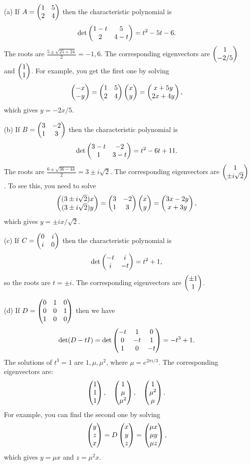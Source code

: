 \documentclass{article}
\begin{document}
\begin{Solution}\label{sol:exr:routineeval}
(a) If \(A=\begin{pmatrix} 1 & 5 \\ 2 & 4 \end{pmatrix}\) then the characteristic
polynomial is \[\det\begin{pmatrix} 1-t & 5 \\ 2 & 4-t \end{pmatrix}=t^2-5t-6.\] The roots
are \(\frac{5\pm\sqrt{25+24}}{2}=-1,6\). The corresponding
eigenvectors are \(\begin{pmatrix} 1 \\ -2/5\end{pmatrix}\) and \(\begin{pmatrix} 1 \\ 1\end{pmatrix}\). For
example, you get the first one by solving \[\begin{pmatrix} -x \\ -y \end{pmatrix}=\begin{pmatrix} 1 &
5 \\ 2 & 4\end{pmatrix}\begin{pmatrix} x \\ y\end{pmatrix}=\begin{pmatrix} x+5y \\ 2x+4y\end{pmatrix},\] which gives
\(y=-2x/5\).


(b) If \(B=\begin{pmatrix} 3 & -2 \\ 1 & 3\end{pmatrix}\) then the characteristic
polynomial is \[\det\begin{pmatrix} 3-t & -2 \\ 1 & 3-t\end{pmatrix}=t^2-6t+11.\] The
roots are \(\frac{6\pm\sqrt{36-44}}{2}=3\pm i\sqrt{2}\). The
corresponding eigenvectors are \(\begin{pmatrix} 1 \\ \pm i\sqrt{2}\end{pmatrix}\). To see
this, you need to solve \[\begin{pmatrix} (3\pm i\sqrt{2})x \\ (3\pm
i\sqrt{2})y\end{pmatrix}=\begin{pmatrix} 3 & -2 \\ 1 & 3\end{pmatrix}\begin{pmatrix} x \\ y\end{pmatrix}=\begin{pmatrix} 3x-2y
\\ x+3y\end{pmatrix},\] which gives \(y=\pm ix/\sqrt{2}\).


(c) If \(C=\begin{pmatrix} 0 & i \\ i & 0\end{pmatrix}\) then the characteristic
polynomial is \[\det\begin{pmatrix} -t & i \\ i & -t\end{pmatrix}=t^2+1,\] so the roots
are \(t=\pm i\). The corresponding eigenvectors are \(\begin{pmatrix} \pm 1
\\ 1\end{pmatrix}\).


(d) If \(D=\begin{pmatrix} 0 & 1 & 0 \\ 0 & 0 & 1 \\ 1 & 0 & 0 \end{pmatrix}\) then we
have \[\det(D-tI)=\det\begin{pmatrix} -t & 1 & 0 \\ 0 & -t & 1 \\ 1 & 0 &
-t\end{pmatrix}=-t^3+1.\] The solutions of \(t^3=1\) are \(1,\mu,\mu^2\),
where \(\mu=e^{2\pi i/3}\). The corresponding eigenvectors are:
\[\begin{pmatrix} 1 \\ 1 \\ 1 \end{pmatrix},\quad\begin{pmatrix} 1 \\ \mu \\ \mu^2\end{pmatrix},\quad\begin{pmatrix} 1
\\ \mu^2 \\ \mu\end{pmatrix}.\] For example, you can find the second one by
solving \[\begin{pmatrix} y\\ z \\x\end{pmatrix}=D\begin{pmatrix} x \\ y \\ z\end{pmatrix}=\begin{pmatrix} \mu x\\ \mu y
\\ \mu z\end{pmatrix},\] which gives \(y=\mu x\) and \(z=\mu^2x\).



\end{Solution}
\end{document}
